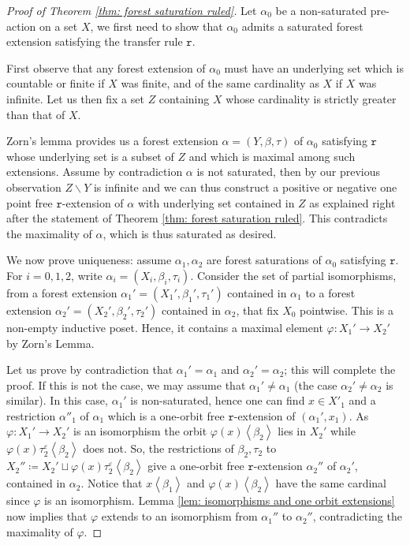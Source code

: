 \documentclass[12pt]{article}
\numberwithin{equation}{section}
\theoremstyle{definition}
\newcommand{\la}{\left\langle}
\newcommand{\ra}{\right\rangle}
\newcommand{\trrule}{\mathtt{r}}
\begin{document}
	\begin{proof}[Proof of Theorem \ref{thm: forest saturation ruled}]
		Let \(\alpha_0\) be a non-saturated pre-action on a set \(X\), we first need to show that 
		\(\alpha_0\) admits a saturated forest extension satisfying the transfer rule \(\trrule \). 
		
		First observe that any forest extension of \(\alpha_0\) must have an underlying set
		which is countable or finite if \(X\) was finite, and of the same cardinality as \(X\)
		if \(X\) was infinite. 
		Let us then fix a set \(Z\) containing \(X\) whose cardinality is strictly greater
		than that of \(X\). 
		
		Zorn's lemma provides us a forest extension \(\alpha=(Y,\beta,\tau)\) of \(\alpha_0\) satisfying \(\trrule\) 
		whose underlying 
		set is a subset of \(Z\) and which is maximal among such extensions. 
		Assume by contradiction \(\alpha\) is not saturated, then by our previous observation 
		\(Z\smallsetminus Y\) is infinite and we can thus construct a positive or negative 
		one point free \( \trrule \)-extension of \(\alpha\) with underlying set contained in \(Z\)
		as explained right after the statement of Theorem \ref{thm: forest saturation ruled}.
		This contradicts the maximality of \(\alpha\), which is thus saturated as desired.

		We now prove uniqueness: assume 
		\( \alpha_1, \alpha_2 \) are forest saturations of \( \alpha_0 \) satisfying \( \trrule \).
		For \( i=0,1,2 \), write \( \alpha_i = (X_i, \beta_i, \tau_i) \).
		Consider the set of partial isomorphisms,
		from a forest extension \( \alpha_1' = (X_1',\beta_1',\tau_1') \) contained in \( \alpha_1 \) 
		to a forest extension \( \alpha_2' = (X_2',\beta_2',\tau_2') \) contained in \( \alpha_2 \),
		that fix \( X_0 \) pointwise.
		This is a non-empty inductive poset.
		Hence, it contains a maximal element \( \varphi:X_1' \to X_2' \) by Zorn's Lemma.
		
		Let us prove by contradiction that $\alpha_1' = \alpha_1$ and $\alpha_2' = \alpha_2$; this will complete the proof.
		If this is  not the case, we may assume that $\alpha_1' \neq \alpha_1$ 
		(the case $\alpha_2' \neq \alpha_2$ is similar).
		In this case, $\alpha_1'$ is non-saturated,
		hence one can find \(x\in X'_1\) and a restriction \(\alpha''_1\) of \( \alpha_1 \)
		which is a one-orbit free \( \trrule \)-extension of \( (\alpha_1',x_1) \).
		As $\varphi: X_1' \to X_2'$ is an isomorphism
		the orbit $\varphi(x) \la \beta_2 \ra$ lies in $X_2'$
		while $\varphi(x) \tau_2^\varepsilon \la \beta_2 \ra$ does not.
		So, the restrictions of $\beta_2, \tau_2$ to 	
		\(X_2'' \coloneqq X_2' \sqcup \varphi(x) \tau_2^\varepsilon \la \beta_2 \ra\)
		give a one-orbit free \(\trrule\)-extension $\alpha_2''$ of $\alpha_2'$, contained in $\alpha_2$.
		Notice that $x \la \beta_1 \ra$ and $\varphi(x) \la \beta_2 \ra$
		have the same cardinal since $\varphi$ is an isomorphism.
		Lemma \ref{lem: isomorphisms and one orbit extensions} now implies
		that $\varphi$ extends to an isomorphism from $\alpha_1''$ to $\alpha_2''$, 
		contradicting the maximality of $\varphi$.
	\end{proof}
\end{document}
